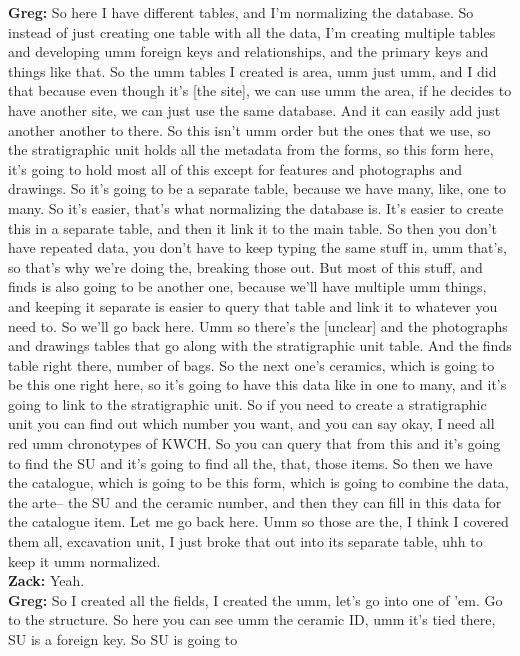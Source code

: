 \documentclass[
  canadian,
]{article}
\begin{document}
\textbf{Greg:} So here I have different tables, and I'm normalizing the
database. So instead of just creating one table with all the data, I'm
creating multiple tables and developing umm foreign keys and
relationships, and the primary keys and things like that. So the umm
tables I created is area, umm just umm, and I did that because even
though it's {[}the site{]}, we can use umm the area, if he decides to
have another site, we can just use the same database. And it can easily
add just another another to there. So this isn't umm order but the ones
that we use, so the stratigraphic unit holds all the metadata from the
forms, so this form here, it's going to hold most all of this except for
features and photographs and drawings. So it's going to be a separate
table, because we have many, like, one to many. So it's easier, that's
what normalizing the database is. It's easier to create this in a
separate table, and then it link it to the main table. So then you don't
have repeated data, you don't have to keep typing the same stuff in, umm
that's, so that's why we're doing the, breaking those out. But most of
this stuff, and finds is also going to be another one, because we'll
have multiple umm things, and keeping it separate is easier to query
that table and link it to whatever you need to. So we'll go back here.
Umm so there's the {[}unclear{]} and the photographs and drawings tables
that go along with the stratigraphic unit table. And the finds table
right there, number of bags. So the next one's ceramics, which is going
to be this one right here, so it's going to have this data like in one
to many, and it's going to link to the stratigraphic unit. So if you
need to create a stratigraphic unit you can find out which number you
want, and you can say okay, I need all red umm chronotypes of KWCH. So
you can query that from this and it's going to find the SU and it's
going to find all the, that, those items. So then we have the catalogue,
which is going to be this form, which is going to combine the data, the
arte-- the SU and the ceramic number, and then they can fill in this
data for the catalogue item. Let me go back here. Umm so those are the,
I think I covered them all, excavation unit, I just broke that out into
its separate table, uhh to keep it umm normalized.\\
\textbf{Zack:} Yeah.\\
\textbf{Greg:} So I created all the fields, I created the umm, let's go
into one of 'em. Go to the structure. So here you can see umm the
ceramic ID, umm it's tied there, SU is a foreign key. So SU is going to
\end{document}
